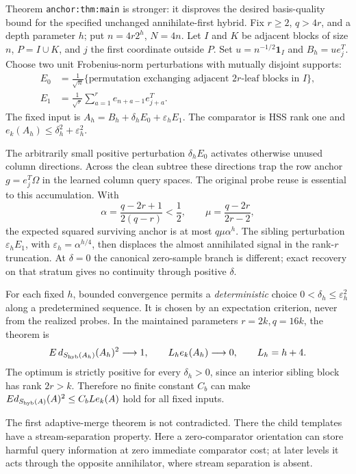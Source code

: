 \documentclass[11pt,oneside,openany,a4paper]{report}
\numberwithin{equation}{chapter}
\theoremstyle{definition}
\theoremstyle{remark}
\begin{document}
Theorem \texttt{anchor:thm:main} is stronger: it disproves the desired
basis-quality bound for the specified unchanged annihilate-first
hybrid.  Fix $r\ge2$, $q>4r$, and a depth parameter $h$; put
$n=4r2^h$, $N=4n$.  Let $I$ and $K$ be adjacent blocks of size
$n$, $P=I\cup K$, and $j$ the first coordinate outside $P$.
Set $u=n^{-1/2}\mathbf1_I$ and $B_h=ue_j^T$.  Choose two unit
Frobenius-norm perturbations with mutually disjoint supports:
\[
 \begin{aligned}
 E_0&=\frac1{\sqrt n}
       \{\text{permutation exchanging adjacent $2r$-leaf blocks in $I$}\},\\
 E_1&=\frac1{\sqrt r}\sum_{a=1}^r e_{n+a-1}e_{j+a}^T.
 \end{aligned}
\]
The fixed input is
$A_h=B_h+\delta_hE_0+\varepsilon_hE_1$.
The comparator is HSS rank one and
$e_k(A_h)\le\delta_h^2+\varepsilon_h^2$.

The arbitrarily small positive perturbation $\delta_hE_0$ activates
otherwise unused column directions.  Across the clean subtree these
directions trap the row anchor
$g=e_j^T\Omega$ in the learned column query spaces.  The original
probe reuse is essential to this accumulation.  With
\[
 \alpha=\frac{q-2r+1}{2(q-r)}<\frac12,\qquad
 \mu=\frac{q-2r}{2r-2},
\]
the expected squared surviving anchor is at most
$q\mu\alpha^h$.  The sibling perturbation
$\varepsilon_hE_1$, with $\varepsilon_h=\alpha^{h/4}$, then
displaces the almost annihilated signal in the rank-$r$ truncation.
At $\delta=0$ the canonical zero-sample branch is different; exact
recovery on that stratum gives no continuity through positive
$\delta$.

For each fixed $h$, bounded convergence permits a
\emph{deterministic} choice
$0<\delta_h\le\varepsilon_h^2$ along a predetermined sequence.
It is chosen by an expectation criterion, never from the realized
probes.  In the maintained parameters $r=2k,q=16k$, the theorem is
\[
 \mathbb E\,d_{\mathcal S_{\rm hyb}(A_h)}(A_h)^2\longrightarrow1,
 \qquad
 L_he_k(A_h)\longrightarrow0,
 \qquad L_h=h+4.
\]
The optimum is strictly positive for every $\delta_h>0$, since an
interior sibling block has rank $2r>k$.  Therefore no finite
constant $C_b$ can make
$\mathbb E d_{\mathcal S_{\rm hyb}(A)}(A)^2\le C_bLe_k(A)$
hold for all fixed inputs.

The first adaptive-merge theorem is not contradicted.  There the
child templates have a stream-separation property.  Here a
zero-comparator orientation can store harmful query information at
zero immediate comparator cost; at later levels it acts through
the opposite annihilator, where stream separation is absent.
\end{document}
